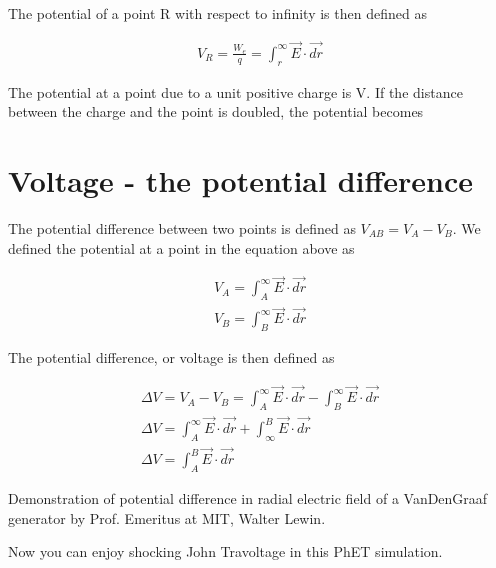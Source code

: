 \documentclass{ximera}
\begin{document}
The potential of a point R with respect to infinity is then defined as 

\begin{eqnarray}
V_R=\frac{W_{e}}{q}=\int_{r}^{\infty}  \vec{E} \cdot \vec{dr}
\end{eqnarray}



\begin{question}  
The potential at a point due to a unit positive charge is  V.  If the distance between the charge and the point is doubled, the potential becomes 
\begin{multipleChoice}  
\end{multipleChoice}  
\end{question}



\section{Voltage - the potential difference}

The potential difference between two points is  defined as $V_{AB}=V_A-V_B$. We defined the potential at a point in the equation above as


\begin{eqnarray}
V_A=\int_{A}^{\infty}  \vec{E} \cdot \vec{dr} \\
V_B=\int_{B}^{\infty}  \vec{E} \cdot \vec{dr} 
\end{eqnarray}

The potential difference, or voltage is then defined as


\begin{eqnarray}
\Delta V = V_A - V_B =\int_{A}^{\infty}  \vec{E} \cdot \vec{dr} -\int_{B}^{\infty}  \vec{E} \cdot \vec{dr}  \\
\Delta V = \int_{A}^{\infty}  \vec{E} \cdot \vec{dr} +\int_{\infty}^{B}  \vec{E} \cdot \vec{dr} \\
\Delta V = \int_{A}^{B} \vec{E} \cdot \vec{dr} 
\end{eqnarray}

Demonstration of potential difference in radial electric field of a VanDenGraaf generator by Prof. Emeritus at MIT, Walter Lewin.
\begin{center}  
\end{center}


Now you can enjoy shocking John Travoltage in this PhET simulation. 
\end{document}
